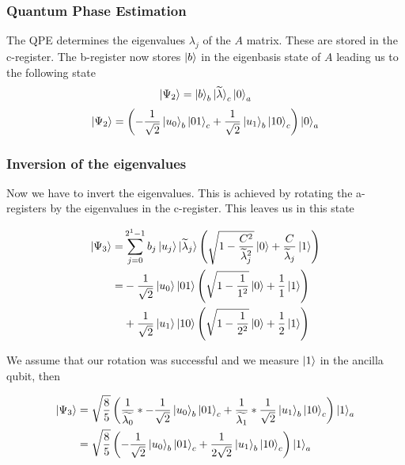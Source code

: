 \subsubsection{Quantum Phase Estimation}
    The QPE determines the eigenvalues $\lambda_j$ of the $A$ matrix. 
    These are stored in the c-register. 
    The b-register now stores $\ket b$ in the eigenbasis state of $A$ leading us to the following state
    \begin{equation}
    \ket{\Psi_2} = \ket{b}_b \ket{\widetilde{\lambda}}_c\ket{0}_a
    \end{equation}
    \begin{equation}
    \ket{\Psi_2} =\left(-\frac{1}{\sqrt{2}} \ket{u_0}_b \ket{01}_c +\frac{1}{\sqrt{2}} \ket{u_1}_b \ket{10}_c \right)  \ket{0}_a
    \end{equation}


\subsubsection{Inversion of the eigenvalues}
    Now we have to invert the eigenvalues. 
    This is achieved by rotating the a-registers by the eigenvalues in the c-register.
    This leaves us in this state

    \begin{equation}
     \begin{split}
    \ket{\Psi_3} =& \sum_{j=0}^{2^{1}-1} b_j \ket{u_j} \ket{\widetilde{\lambda}_j} \left(\sqrt{1-\frac{C^2}{\widetilde{\lambda}_j^2}}\ket{0} + \frac{C}{\widetilde{\lambda}_j} \ket{1}\right) \\
    =&-\frac{1}{\sqrt{2}} \ket{u_0} \ket{01}\left(\sqrt{1-\frac{1}{1^2}}\ket{0} + \frac{1}{1} \ket{1}\right) \\
    &+\frac{1}{\sqrt{2}}  \ket{u_1} \ket{10} \left(\sqrt{1-\frac{1}{2^2}}\ket{0} + \frac{1}{2} \ket{1}\right)
     \end{split}
    \end{equation}

    We assume that our rotation was successful and we measure $\ket{1}$ in the ancilla qubit, then
    

    \begin{equation}
    \begin{split}
    \ket{\Psi_3} &=\sqrt{\frac{8}{5}}\left(\frac {1} {\widetilde{\lambda_0}} *-\frac{1}{\sqrt{2}} \ket{u_0}_b\ket{01}_c +\frac{1}{\widetilde{\lambda_1}}*\frac{1}{\sqrt{2}} \ket{u_1}_b\ket{10}_c\right)\ket{1}_a \\
    &=\sqrt{\frac{8}{5}}\left(-\frac{1}{\sqrt{2}} \ket{u_0}_b\ket{01}_c +\frac{1}{2\sqrt{2}} \ket{u_1}_b\ket{10}_c\right)\ket{1}_a 
    \end{split}
    \end{equation}

